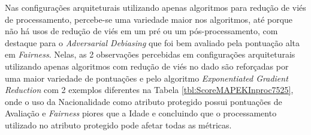 \documentclass[portugues]{ic-tese}
\begin{document}
Nas configurações arquiteturais utilizando apenas algoritmos para redução de viés de processamento, percebe-se uma variedade maior nos algoritmos, até porque não há usos de redução de viés em um pré ou um pós-processamento, com destaque para o \textit{Adversarial Debiasing} que foi bem avaliado pela pontuação alta em \textit{Fairness}. Nelas, as 2 observações percebidas em configurações arquiteturais utilizando apenas algoritmos com redução de viés no dado são reforçadas por uma maior variedade de pontuações e pelo algoritmo \textit{Exponentiated Gradient Reduction} com 2 exemplos diferentes na Tabela \ref{tbl:ScoreMAPEKInproc7525}, onde o uso da Nacionalidade como atributo protegido possui pontuações de Avaliação e \textit{Fairness} piores que a Idade e concluindo que o processamento utilizado no atributo protegido pode afetar todas as métricas.

\begin{table}[H]
\begin{center}
  \caption{Melhores configurações escolhidas pelo Gerenciador Autonômico \\ Algoritmos para redução de viés de pós-processamento - 50\% Avaliação/50\% \textit{Fairness}}
\label{tbl:ScoreMAPEKPostproc5050}
\end{center}
\end{table}
\end{document}

